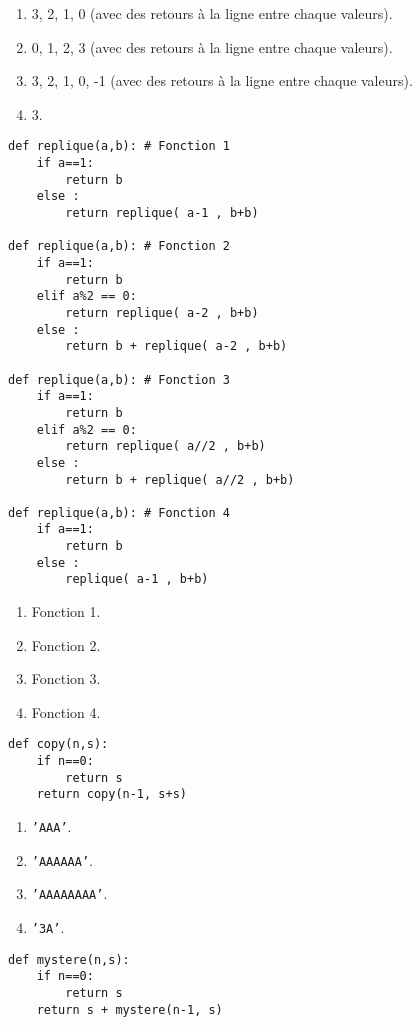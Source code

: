\begin{enumerate}
\item 3, 2, 1, 0 (avec des retours à la ligne entre chaque valeurs).
\item 0, 1, 2, 3 (avec des retours à la ligne entre chaque valeurs).
\item 3, 2, 1, 0, -1 (avec des retours à la ligne entre chaque valeurs). %
\item 3.
\end{enumerate}

\begin{lstlisting}
def replique(a,b): # Fonction 1
    if a==1:
        return b
    else :
        return replique( a-1 , b+b)

def replique(a,b): # Fonction 2
    if a==1:
        return b
    elif a%2 == 0:
        return replique( a-2 , b+b)
    else :
        return b + replique( a-2 , b+b)

def replique(a,b): # Fonction 3
    if a==1:
        return b
    elif a%2 == 0:
        return replique( a//2 , b+b)
    else :
        return b + replique( a//2 , b+b)

def replique(a,b): # Fonction 4
    if a==1:
        return b
    else :
        replique( a-1 , b+b)
\end{lstlisting}

\begin{enumerate}
\item Fonction 1.
\item Fonction 2.
\item Fonction 3.
\item Fonction 4.
\end{enumerate}

\begin{lstlisting}
def copy(n,s):
    if n==0:
        return s
    return copy(n-1, s+s)
\end{lstlisting}

\begin{enumerate}
\item \texttt{'AAA'}.
\item \texttt{'AAAAAA'}.
\item \texttt{'AAAAAAAA'}.
\item \texttt{'3A'}.
\end{enumerate}

\begin{lstlisting}
def mystere(n,s):
    if n==0:
        return s
    return s + mystere(n-1, s)
\end{lstlisting}

